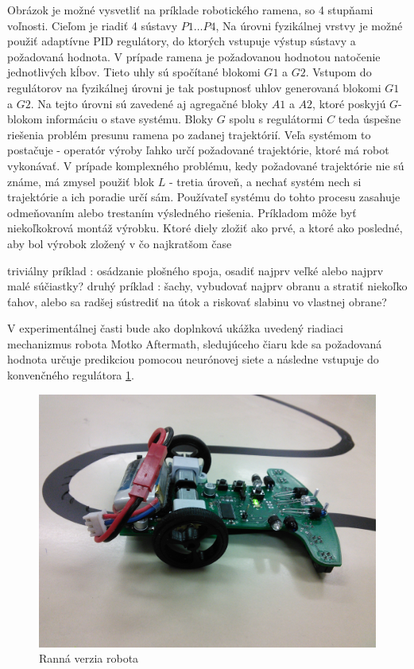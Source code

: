 Obrázok je možné vysvetliť na príklade robotického ramena, so 4 stupňami voľnosti.
Cieľom je riadiť 4 sústavy $P1 \dots P4$, Na úrovni fyzikálnej vrstvy je možné použiť
adaptívne PID regulátory, do ktorých vstupuje výstup sústavy a požadovaná hodnota.
V prípade ramena je požadovanou hodnotou natočenie jednotlivých kĺbov. Tieto uhly sú
spočítané blokomi $G1$ a $G2$. Vstupom do regulátorov na fyzikálnej úrovni je tak
postupnosť uhlov generovaná blokomi $G1$ a $G2$. Na tejto úrovni sú zavedené aj
agregačné bloky $A1$ a $A2$, ktoré poskyjú $G$-blokom informáciu o stave systému.
Bloky $G$ spolu s regulátormi $C$ teda úspešne riešenia problém presunu ramena
po zadanej trajektórií.
Veľa systémom to postačuje - operatór výroby ľahko určí požadované trajektórie,
ktoré má robot vykonávať. V prípade komplexného problému, kedy požadované trajektórie
nie sú známe, má zmysel použiť blok $L$ - tretia úroveň, a nechať systém nech si trajektórie
a ich poradie určí sám. Používateľ systému do tohto procesu zasahuje odmeňovaním
alebo trestaním výsledného riešenia. Príkladom môže byť niekoľkokrová montáž výrobku.
Ktoré diely zložiť ako prvé, a ktoré ako posledné, aby bol výrobok zložený v čo najkratšom čase

triviálny príklad : osádzanie plošného spoja, osadiť najprv veľké alebo najprv malé súčiastky?
druhý príklad : šachy, vybudovať najprv obranu a stratiť niekoľko ťahov,
alebo sa radšej sústrediť na útok a riskovať slabinu vo vlastnej obrane?

V experimentálnej časti bude ako doplnková ukážka uvedený riadiaci mechanizmus robota
Motko Aftermath, sledujúceho čiaru kde sa požadovaná hodnota určuje predikciou pomocou neurónovej siete a
následne vstupuje do konvenčného regulátora \ref{img:motoko_reloaded}.

\begin{figure}[!htb]
\center
\includegraphics[scale=.1]{../pictures/motoko.jpg}
\caption{Ranná verzia robota}
\label{img:motoko_reloaded}
\end{figure}


